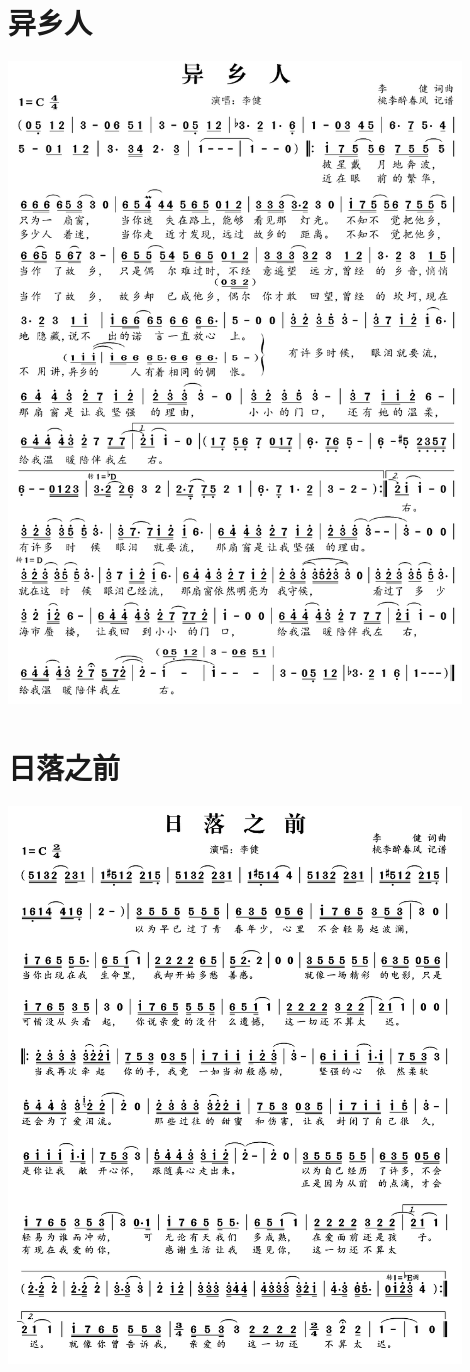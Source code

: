 \documentclass[cn,pad,twocol]{elegantbook}
\begin{document}
\section{异乡人} \includegraphics[width=0.9\textwidth]{rpi400/20210212李健异乡人.png}
\section{日落之前} \includegraphics[width=0.9\textwidth]{rpi400/20210212李健日落之前.png}
\end{document}

